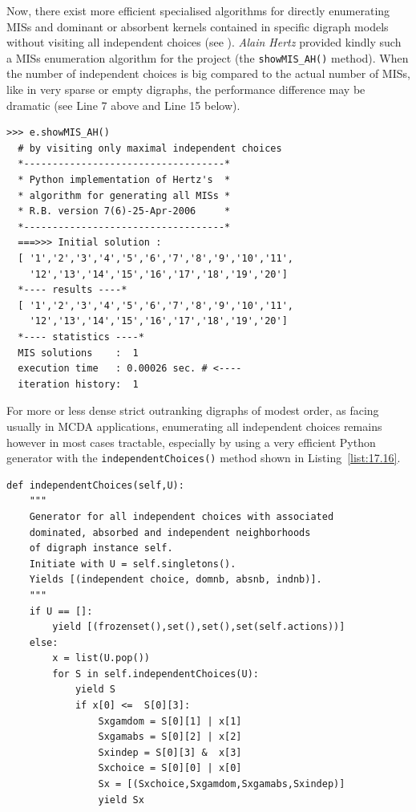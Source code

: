 Now, there exist more efficient specialised algorithms for directly enumerating MISs and dominant or absorbent kernels contained in specific digraph models without visiting all independent choices (see \citealp{BIS-2006b}). \emph{Alain Hertz} provided kindly such a MISs enumeration algorithm for the \Digraph project (the \texttt{showMIS\_AH()} method). When the number of independent choices is big compared to the actual number of MISs, like in very sparse or empty digraphs, the performance difference may be dramatic (see Line 7 above and Line 15 below).
\begin{lstlisting}[caption={Enumerating MISs by visiting only maximal independent choices (\emph{A. Hertz}) },label=list:17.15]
>>> e.showMIS_AH()
  # by visiting only maximal independent choices
  *-----------------------------------*
  * Python implementation of Hertz's  *
  * algorithm for generating all MISs *
  * R.B. version 7(6)-25-Apr-2006     *
  *-----------------------------------*
  ===>>> Initial solution :
  [ '1','2','3','4','5','6','7','8','9','10','11',
    '12','13','14','15','16','17','18','19','20']
  *---- results ----*
  [ '1','2','3','4','5','6','7','8','9','10','11',
    '12','13','14','15','16','17','18','19','20']
  *---- statistics ----*
  MIS solutions    :  1
  execution time   : 0.00026 sec. # <----
  iteration history:  1
\end{lstlisting}

For more or less dense strict outranking digraphs of modest order, as facing usually in MCDA applications, enumerating all independent choices remains however in most cases tractable, especially by using a very efficient Python generator with the \texttt{independentChoices()} method shown in Listing~\vref{list:17.16}.
\begin{lstlisting}[caption={Generating all independent choices in a digraph},label=list:17.16]
def independentChoices(self,U):
    """
    Generator for all independent choices with associated
    dominated, absorbed and independent neighborhoods
    of digraph instance self.
    Initiate with U = self.singletons().
    Yields [(independent choice, domnb, absnb, indnb)].
    """
    if U == []:
        yield [(frozenset(),set(),set(),set(self.actions))]
    else:
        x = list(U.pop())
        for S in self.independentChoices(U):
            yield S
            if x[0] <=  S[0][3]:
                Sxgamdom = S[0][1] | x[1]
                Sxgamabs = S[0][2] | x[2]
                Sxindep = S[0][3] &  x[3]
                Sxchoice = S[0][0] | x[0]
                Sx = [(Sxchoice,Sxgamdom,Sxgamabs,Sxindep)]
                yield Sx
\end{lstlisting}

